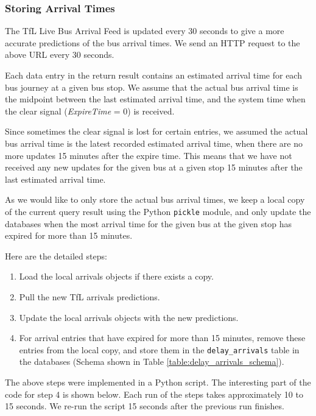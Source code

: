 \subsubsection{Storing Arrival Times}
\par The TfL Live Bus Arrival Feed is updated every 30 seconds to give a more accurate predictions of the bus arrival times. We send an HTTP request to the above URL every 30 seconds.

\par Each data entry in the return result contains an estimated arrival time for each bus journey at a given bus stop. We assume that the actual bus arrival time is the midpoint between the last estimated arrival time, and the system time when the clear signal (\textit{ExpireTime} = 0) is received.

\par Since sometimes the clear signal is lost for certain entries, we assumed the actual bus arrival time is the latest recorded estimated arrival time, when there are no more updates 15 minutes after the expire time. This means that we have not received any new updates for the given bus at a given stop 15 minutes after the last estimated arrival time.

\par As we would like to only store the actual bus arrival times, we keep a local copy of the current query result using the Python \texttt{pickle} module\cite{pickle}, and only update the databases when the most arrival time for the given bus at the given stop has expired for more than 15 minutes.

\par Here are the detailed steps:

\begin{enumerate}
  \item Load the local arrivals objects if there exists a copy.
  \item Pull the new TfL arrivals predictions.
  \item Update the local arrivals objects with the new predictions.
  \item For arrival entries that have expired for more than 15 minutes, remove these entries from the local copy, and store them in the \texttt{delay\_arrivals} table in the databases (Schema shown in Table \ref{table:delay_arrivals_schema}).
\end{enumerate}

The above steps were implemented in a Python script. The interesting part of the code for step 4 is shown below. Each run of the steps takes approximately 10 to 15 seconds. We re-run the script 15 seconds after the previous run finishes.
\label{sec:arrivals_daemon}

